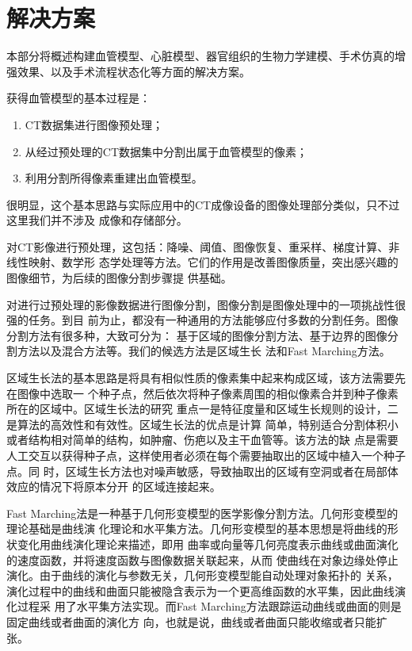 \section{解决方案}
\label{sec1-3}

本部分将概述构建血管模型、心脏模型、器官组织的生物力学建模、手术仿真的增强效果、以及手术流程状态化等方面的解决方案。

获得血管模型的基本过程是\cite{Preim2008Review}：
\begin{enumerate}
  \item CT数据集进行图像预处理；
  \item 从经过预处理的CT数据集中分割出属于血管模型的像素；
  \item 利用分割所得像素重建出血管模型。
\end{enumerate}
很明显，这个基本思路与实际应用中的CT成像设备的图像处理部分类似，只不过这里我们并不涉及
成像和存储部分。

对CT影像进行预处理，这包括：降噪、阈值、图像恢复、重采样、梯度计算、非线性映射、数学形
态学处理等方法。它们的作用是改善图像质量，突出感兴趣的图像细节，为后续的图像分割步骤提
供基础。

对进行过预处理的影像数据进行图像分割，图像分割是图像处理中的一项挑战性很强的任务。到目
前为止，都没有一种通用的方法能够应付多数的分割任务。图像分割方法有很多种，大致可分为：
基于区域的图像分割方法、基于边界的图像分割方法以及混合方法等。我们的候选方法是区域生长
法和Fast Marching方法。

区域生长法的基本思路是将具有相似性质的像素集中起来构成区域，该方法需要先在图像中选取一
个种子点，然后依次将种子像素周围的相似像素合并到种子像素所在的区域中。区域生长法的研究
重点一是特征度量和区域生长规则的设计，二是算法的高效性和有效性。区域生长法的优点是计算
简单，特别适合分割体积小或者结构相对简单的结构，如肿瘤、伤疤以及主干血管等。该方法的缺
点是需要人工交互以获得种子点，这样使用者必须在每个需要抽取出的区域中植入一个种子点。同
时，区域生长方法也对噪声敏感，导致抽取出的区域有空洞或者在局部体效应的情况下将原本分开
的区域连接起来。

Fast Marching法是一种基于几何形变模型的医学影像分割方法。几何形变模型的理论基础是曲线演
化理论和水平集方法。几何形变模型的基本思想是将曲线的形状变化用曲线演化理论来描述，即用
曲率或向量等几何亮度表示曲线或曲面演化的速度函数，并将速度函数与图像数据关联起来，从而
使曲线在对象边缘处停止演化。由于曲线的演化与参数无关，几何形变模型能自动处理对象拓扑的
关系，演化过程中的曲线和曲面只能被隐含表示为一个更高维函数的水平集，因此曲线演化过程采
用了水平集方法实现。而Fast Marching方法跟踪运动曲线或曲面的则是固定曲线或者曲面的演化方
向，也就是说，曲线或者曲面只能收缩或者只能扩张。

